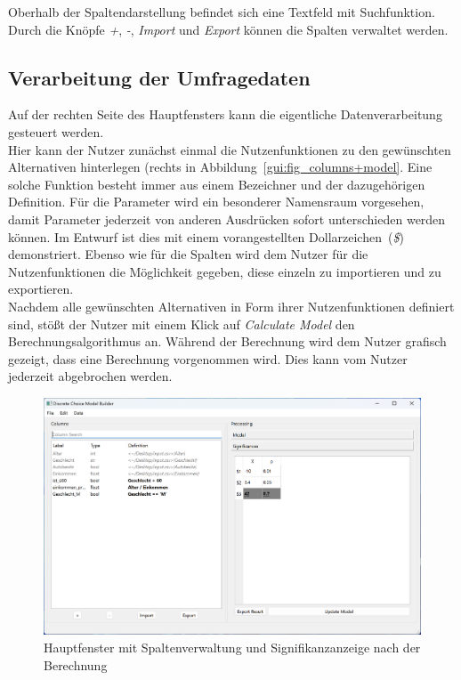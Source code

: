 \documentclass{article}
\begin{document}
Oberhalb der Spaltendarstellung befindet sich eine Textfeld mit Suchfunktion. Durch die Knöpfe \emph{+}, \emph{-}, \emph{Import} und \emph{Export} können die Spalten verwaltet werden.


\subsection{Verarbeitung der Umfragedaten}

Auf der rechten Seite des Hauptfensters kann die eigentliche Datenverarbeitung gesteuert werden.\\

Hier kann der Nutzer zunächst einmal die Nutzenfunktionen zu den gewünschten Alternativen hinterlegen (rechts in Abbildung~\ref{gui:fig_columns+model}. Eine solche Funktion besteht immer aus einem Bezeichner und der dazugehörigen Definition. Für die Parameter wird ein besonderer Namensraum vorgesehen, damit Parameter jederzeit von anderen Ausdrücken sofort unterschieden werden können. Im Entwurf ist dies mit einem vorangestellten Dollarzeichen~(\emph{\$}) demonstriert. Ebenso wie für die Spalten wird dem Nutzer für die Nutzenfunktionen die Möglichkeit gegeben, diese einzeln zu importieren und zu exportieren.\\

Nachdem alle gewünschten Alternativen in Form ihrer Nutzenfunktionen definiert sind, stößt der Nutzer mit einem Klick auf \emph{Calculate Model} den Berechnungsalgorithmus an. Während der Berechnung wird dem Nutzer grafisch gezeigt, dass eine Berechnung vorgenommen wird. Dies kann vom Nutzer jederzeit abgebrochen werden.\\

\begin{figure}[H]%
  \centering
  \includegraphics[width=12cm]{specifications/img/gui-screenshots/columns+significances.png}
  \caption{Hauptfenster mit Spaltenverwaltung und Signifikanzanzeige nach der Berechnung}
  \label{gui:fig_columns+significances}
\end{figure}
\end{document}
